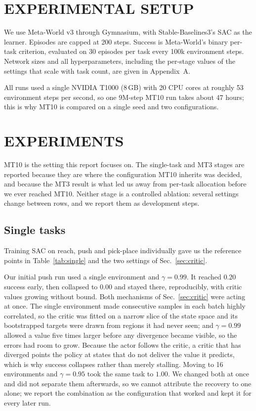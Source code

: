 \documentclass[letterpaper, 10 pt, conference]{ieeeconf}
\begin{document}
\section{EXPERIMENTAL SETUP}

We use Meta-World v3 \cite{yu2020metaworld} through Gymnasium, with Stable-Baselines3's SAC
\cite{raffin2021sb3} as the learner. Episodes are capped at 200 steps. Success is
Meta-World's binary per-task criterion, evaluated on 30 episodes per task every 100k
environment steps. Network sizes and all hyperparameters, including the per-stage values
of the settings that scale with task count, are given in Appendix~A.

All runs used a single NVIDIA T1000 (8\,GB) with 20 CPU cores at roughly 53 environment
steps per second, so one 9M-step MT10 run takes about 47 hours; this is why MT10 is compared on
a single seed and two configurations.

\section{EXPERIMENTS}
\label{sec:experiments}

MT10 is the setting this report focuses on. The single-task and MT3 stages are reported
because they are where the configuration MT10 inherits was decided, and because the MT3
result is what led us away from per-task allocation before we ever reached MT10.
Neither stage is a controlled ablation: several settings change between rows, and we
report them as development steps.

\subsection{Single tasks}
\label{sec:single}

Training SAC on reach, push and pick-place individually gave us the
reference points in Table~\ref{tab:single} and the two settings of Sec.~\ref{sec:critic}.

Our initial push run used a single environment and $\gamma = 0.99$. It reached $0.20$
success early, then collapsed to $0.00$ and stayed there, reproducibly, with critic values
growing without bound. Both mechanisms of Sec.~\ref{sec:critic} were acting at once. The
single environment made consecutive samples in each batch highly correlated, so the critic was
fitted on a narrow slice of the state space and its bootstrapped targets were drawn from
regions it had never seen; and $\gamma = 0.99$ allowed a value five times larger before any
divergence became visible, so the errors had room to grow. Because the actor follows the
critic, a critic that has diverged points the policy at states that do not deliver the value
it predicts, which is why success collapses rather than merely stalling. Moving to 16
environments and $\gamma = 0.95$ took the same task to $1.00$. We changed both at once and did
not separate them afterwards, so we cannot attribute the recovery to one alone; we report the
combination as the configuration that worked and kept it for every later run.
\end{document}
